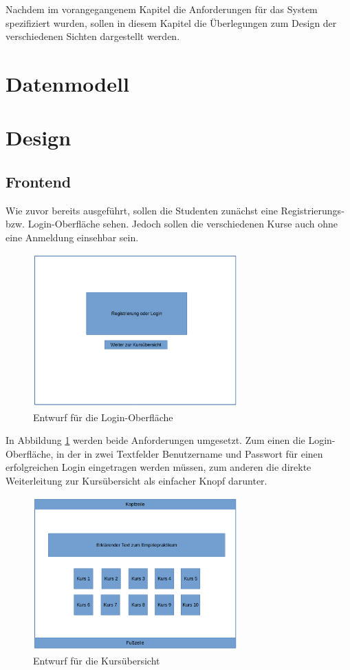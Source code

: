 Nachdem im vorangegangenem Kapitel die Anforderungen für das System spezifiziert wurden, sollen in diesem Kapitel die Überlegungen zum Design der verschiedenen Sichten dargestellt werden.

\section{Datenmodell}

\section{Design}
    \subsection{Frontend}
        Wie zuvor bereits ausgeführt, sollen die Studenten zunächst eine Registrierungs- bzw. Login-Oberfläche sehen.
        Jedoch sollen die verschiedenen Kurse auch ohne eine Anmeldung einsehbar sein.
        \begin{figure}[t]
        	\centering
        	\includegraphics[width=0.7\textwidth]{./design/MockUpsFrontend/login.png}
        	\caption{Entwurf für die Login-Oberfläche}
        	\label{mockupLoginFrontend}
        \end{figure}
        In Abbildung \ref{mockupLoginFrontend} werden beide Anforderungen umgesetzt.
        Zum einen die Login-Oberfläche, in der in zwei Textfelder Benutzername und Passwort für einen erfolgreichen Login eingetragen werden müssen, zum anderen die direkte Weiterleitung zur Kursübersicht als einfacher Knopf darunter.
        \begin{figure}[t]
        	\centering
        	\includegraphics[width=0.7\textwidth]{./design/MockUpsFrontend/kursuebersicht.png}
        	\caption{Entwurf für die Kursübersicht}
        	\label{mockupCoursesFrontend}
        \end{figure}
        
